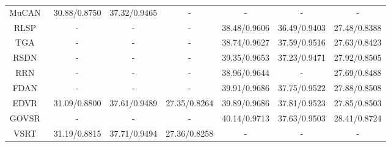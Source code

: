\documentclass{article}
\newlength \g
\begin{document}
\begin{table*}[!t]
\begin{center}
{\begin{tabular}{c|c|c|c|c|c|c}
                MuCAN~\cite{li2020mucan}              & 30.88/0.8750                         & 37.32/0.9465                       & -                           & -                              & -                               & -                           \\
                RLSP~\cite{fuoli2019rlsp}             & -                                    & -                                  & -                           & 38.48/0.9606                   & 36.49/0.9403                    & 27.48/0.8388                \\
                TGA~\cite{isobe2020tga}                  & -                                    & -                                  & -                           & 38.74/0.9627                              & 37.59/0.9516                    & 27.63/0.8423                \\
                RSDN~\cite{isobe2020rsdn}              & -                                    & -                                  & -                           & 39.35/0.9653                   & 37.23/0.9471                    & 27.92/0.8505                \\
                 RRN~\cite{isobe2020rrn}          & -                                    & -                                  & -                           & 38.96/0.9644                   & -                               & 27.69/0.8488                \\
                FDAN~\cite{lin2021fdan}                 & -                                    & -                                  & -                           & 39.91/0.9686                  & 37.75/0.9522                   & 27.88/0.8508                \\
               EDVR~\cite{wang2019edvr}              & 31.09/0.8800                         & {37.61}/{0.9489}             & 27.35/0.8264                & 39.89/0.9686                   & 37.81/0.9523                    & 27.85/0.8503                \\
                 GOVSR~\cite{yi2021omniscient}            & -                                    & -                                  &      -                    &       40.14/0.9713               &          37.63/0.9503           & 28.41/0.8724               \\
                VSRT~\cite{cao2021videosr}        & {31.19/0.8815}                         & 37.71/0.9494             & 27.36/0.8258                & -                   & -                    & -               \\

\end{tabular}}
\end{center}
\end{table*}
\end{document}
